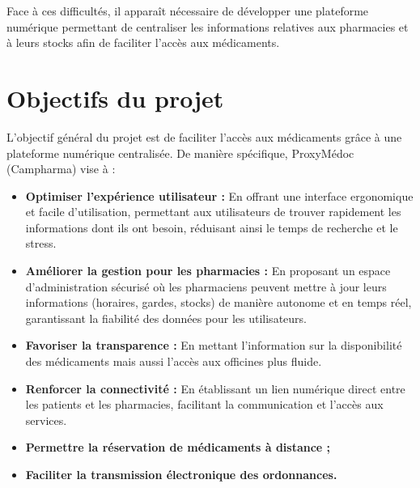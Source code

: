 \documentclass[12pt,a4paper]{report}
\begin{document}
	Face à ces difficultés, il apparaît nécessaire de développer une plateforme numérique permettant de centraliser les informations relatives aux pharmacies et à leurs stocks afin de faciliter l'accès aux médicaments. %
	
	\section{Objectifs du projet} %
	L'objectif général du projet est de faciliter l'accès aux médicaments grâce à une plateforme numérique centralisée. %
	De manière spécifique, ProxyMédoc (Campharma) vise à : %
	\begin{itemize} %
		\item \textbf{\color{VertPharma}Optimiser l'expérience utilisateur :} En offrant une interface ergonomique et facile d'utilisation, permettant aux utilisateurs de trouver rapidement les informations dont ils ont besoin, réduisant ainsi le temps de recherche et le stress. %
		\item \textbf{\color{VertPharma}Améliorer la gestion pour les pharmacies :} En proposant un espace d'administration sécurisé où les pharmaciens peuvent mettre à jour leurs informations (horaires, gardes, stocks) de manière autonome et en temps réel, garantissant la fiabilité des données pour les utilisateurs. %
		\item \textbf{\color{VertPharma}Favoriser la transparence :} En mettant l'information sur la disponibilité des médicaments mais aussi l'accès aux officines plus fluide. %
		\item \textbf{\color{VertPharma}Renforcer la connectivité :} En établissant un lien numérique direct entre les patients et les pharmacies, facilitant la communication et l'accès aux services. %
		\item \textbf{\color{VertPharma}Permettre la réservation de médicaments à distance ;} %
		\item \textbf{\color{VertPharma}Faciliter la transmission électronique des ordonnances.} %
	\end{itemize} %
	
\end{document}

